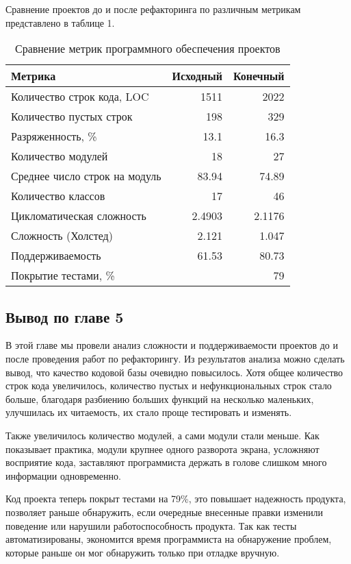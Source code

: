     Сравнение проектов до и после рефакторинга по различным метрикам представлено в таблице 1.
    \begin{table}[H]
        \caption{Сравнение метрик программного обеспечения проектов}
        \begin{center}
            \begin{tabular}{l|r|r}
                \textbf{Метрика} & \textbf{Исходный} & \textbf{Конечный} \\
                \hline
                Количество строк кода, LOC    & 1511    & 2022 \\
                Количество пустых строк       & 198     & 329 \\
                Разряженность, \%             & 13.1    & 16.3 \\
                Количество модулей            & 18      & 27 \\
                Среднее число строк на модуль & 83.94   & 74.89 \\
                Количество классов            & 17      & 46 \\
                Цикломатическая сложность     & 2.4903  & 2.1176 \\
                Сложность (Холстед)           & 2.121   & 1.047 \\
                Поддерживаемость              & 61.53   & 80.73 \\
                Покрытие тестами, \%          &         & 79 \\
            \end{tabular}
        \end{center}
    \end{table}

    \subsection*{Вывод по главе 5}
    В этой главе мы провели анализ сложности и поддерживаемости проектов
    до и после проведения работ по рефакторингу. Из результатов анализа
    можно сделать вывод, что качество кодовой базы очевидно повысилось.
    Хотя общее количество строк кода увеличилось, количество пустых и
    нефункциональных строк стало больше, благодаря разбиению больших функций
    на несколько маленьких, улучшилась их читаемость, их стало проще тестировать
    и изменять.

    Также увеличилось количество модулей, а сами модули стали меньше.
    Как показывает практика, модули крупнее одного разворота экрана, усложняют
    восприятие кода, заставляют программиста держать в голове слишком много
    информации одновременно.

    Код проекта теперь покрыт тестами на 79\%, это повышает надежность продукта,
    позволяет раньше обнаружить, если очередные внесенные правки
    изменили поведение или нарушили работоспособность продукта.
    Так как тесты автоматизированы, экономится время программиста на обнаружение
    проблем, которые раньше он мог обнаружить только при отладке вручную.
